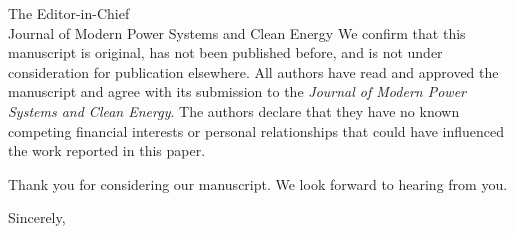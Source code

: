 \documentclass[11pt]{letter}
\begin{document}
\begin{letter}{The Editor-in-Chief\\Journal of Modern Power Systems and Clean Energy}
We confirm that this manuscript is original, has not been published before, and is not under consideration for publication elsewhere. All authors have read and approved the manuscript and agree with its submission to the \textit{Journal of Modern Power Systems and Clean Energy}. The authors declare that they have no known competing financial interests or personal relationships that could have influenced the work reported in this paper.

Thank you for considering our manuscript. We look forward to hearing from you.

\closing{Sincerely,}
\end{letter}
\end{document}
